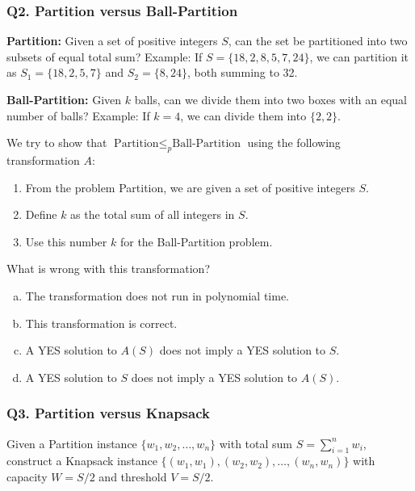 \documentclass[9pt]{extarticle}
\begin{document}
\subsubsection{Q2. Partition versus Ball-Partition}

\textbf{Partition:}  
Given a set of positive integers \( S \), can the set be partitioned into two subsets of equal total sum?  
Example: If \( S = \{18, 2, 8, 5, 7, 24\} \), we can partition it as  
\( S_1 = \{18, 2, 5, 7\} \) and \( S_2 = \{8, 24\} \), both summing to 32.

\textbf{Ball-Partition:}  
Given \( k \) balls, can we divide them into two boxes with an equal number of balls?  
Example: If \( k = 4 \), we can divide them into \(\{2, 2\}\).

We try to show that \( \text{Partition} \leq_p \text{Ball-Partition} \) using the following transformation \( A \):

\begin{enumerate}
    \item From the problem Partition, we are given a set of positive integers \( S \).
    \item Define \( k \) as the total sum of all integers in \( S \).
    \item Use this number \( k \) for the Ball-Partition problem.
\end{enumerate}

What is wrong with this transformation?

\begin{enumerate}[(a)]
    \item The transformation does not run in polynomial time.
    \item This transformation is correct.
    \item A YES solution to \( A(S) \) does not imply a YES solution to \( S \).
    \item A YES solution to \( S \) does not imply a YES solution to \( A(S) \).
\end{enumerate}

\subsubsection{Q3. Partition versus Knapsack}

Given a Partition instance \( \{w_1, w_2, \dots, w_n\} \) with total sum \( S = \sum_{i=1}^{n} w_i \),  
construct a Knapsack instance \(\{(w_1, w_1), (w_2, w_2), \dots, (w_n, w_n)\}\)  
with capacity \( W = S/2 \) and threshold \( V = S/2 \).
\end{document}
